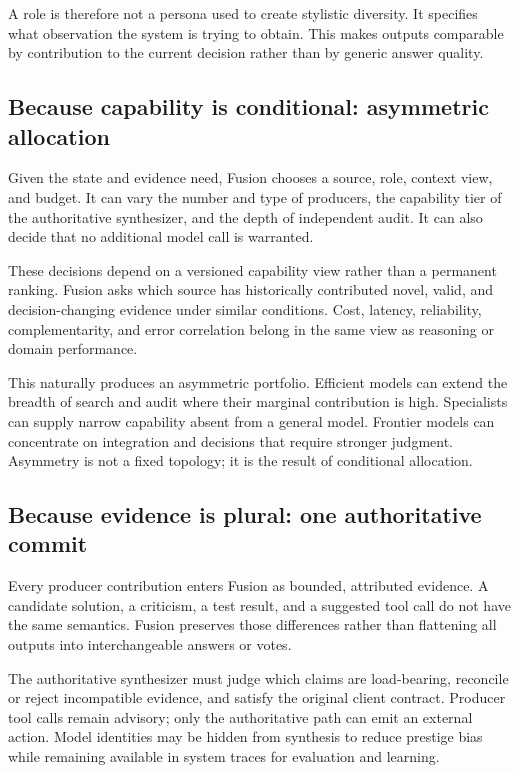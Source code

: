 A role is therefore not a persona used to create stylistic diversity. It
specifies what observation the system is trying to obtain. This makes outputs
comparable by contribution to the current decision rather than by generic
answer quality.

\subsection{Because capability is conditional: asymmetric allocation}

Given the state and evidence need, Fusion chooses a source, role, context view,
and budget. It can vary the number and type of producers, the capability tier
of the authoritative synthesizer, and the depth of independent audit. It can
also decide that no additional model call is warranted.

These decisions depend on a versioned capability view rather than a permanent
ranking. Fusion asks which source has historically contributed novel, valid,
and decision-changing evidence under similar conditions. Cost, latency,
reliability, complementarity, and error correlation belong in the same view as
reasoning or domain performance.

This naturally produces an asymmetric portfolio. Efficient models can extend
the breadth of search and audit where their marginal contribution is high.
Specialists can supply narrow capability absent from a general model. Frontier
models can concentrate on integration and decisions that require stronger
judgment. Asymmetry is not a fixed topology; it is the result of conditional
allocation.

\subsection{Because evidence is plural: one authoritative commit}

Every producer contribution enters Fusion as bounded, attributed evidence. A
candidate solution, a criticism, a test result, and a suggested tool call do
not have the same semantics. Fusion preserves those differences rather than
flattening all outputs into interchangeable answers or votes.

The authoritative synthesizer must judge which claims are load-bearing,
reconcile or reject incompatible evidence, and satisfy the original client
contract. Producer tool calls remain advisory; only the authoritative path can
emit an external action. Model identities may be hidden from synthesis to
reduce prestige bias while remaining available in system traces for evaluation
and learning.

